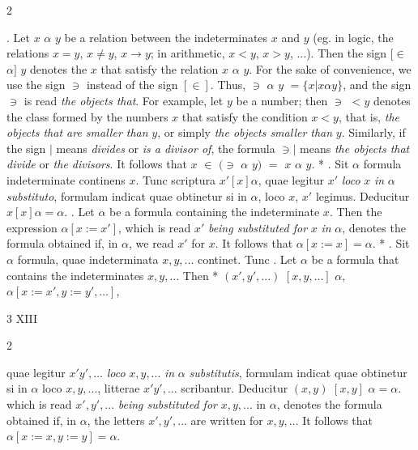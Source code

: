 \documentclass{book}
\newcommand{\s}{\switchcolumn} %
\newcommand{\peanoPage}[1]{\vspace{1ex}

  \columnratio{0.475, 0.05, 0.475} \begin{paracol}{3} \centering \hdashrule{\columnwidth}{0.1mm}{0.1mm 1mm} \s #1 \s \hdashrule{\columnwidth}{0.1mm}{0.1mm 1mm} \end{paracol}

\vspace{1ex}}
\newenvironment{translateTwoCol}
               { %
                 \columnratio{0.5, 0.5} \begin{paracol}{2}
                 \newcommand{\LAT}{\switchcolumn[0]*}
                 \newcommand{\ENG}{\switchcolumn[1]}
               }
               { %
                 \let\ENG\undefined
                 \let\LAT\undefined
                 \end{paracol}
               }
\begin{document}
\begin{translateTwoCol}
\ENG
{}. Let $x$ $\alpha$ $y$ be a relation between the indeterminates $x$ and $y$ (eg. in logic, the relations $x = y$, $x \not= y$, $x \rightarrow y$; in arithmetic, $x < y$, $x > y$, ...). Then the sign $[\in$ $\alpha]$ $y$ denotes the $x$ that satisfy the relation $x$ $\alpha$ $y$. For the sake of convenience, we use the sign $\ni$ instead of the sign $[\in]$. Thus, $\ni$ $\alpha$ $y$  $= \{ x | x \alpha y \}$, and the sign $\ni$ is read \emph{the objects that}. For example, let $y$ be a number; then $\ni$ $< y$ denotes the class formed by the numbers $x$ that satisfy the condition $x<y$, that is, \emph{the objects that are smaller than} $y$, or simply \emph{the objects smaller than} $y$. Similarly, if the sign $|$ means \emph{divides} or \emph{is a divisor of}, the formula $\ni|$ means \emph{the objects that divide} or \emph{the divisors}. It follows that $x$ $\in$ $(\ni$ $\alpha$ $y)$ $=$ $x$ $\alpha$ $y$.
\LAT
{}. Sit $\alpha$ formula indeterminate continens $x$. Tunc scriptura $x' [x] \alpha$, quae legitur $x'$ \emph{loco} $x$ \emph{in} $\alpha$ \emph{substituto}, formulam indicat quae obtinetur si in $\alpha$, loco $x$, $x'$ legimus. Deducitur $x [x] \alpha = \alpha$.
\ENG
{}. Let $\alpha$ be a formula containing the indeterminate $x$. Then the expression $\alpha [ x := x' ]$, which is read $x'$ \emph{being substituted for} $x$ \emph{in} $\alpha$, denotes the formula obtained if, in $\alpha$, we read $x'$ for $x$. It follows that $\alpha[x := x] = \alpha$.
\LAT
{}. Sit $\alpha$ formula, quae indeterminata $x,y,...$ continet. Tunc
\ENG
{}. Let $\alpha$ be a formula that contains the indeterminates $x,y,...$ Then
\LAT
\hspace{1.06cm} $(x',y',...)$ $[x,y,...]$ $\alpha$,
\ENG
\hspace{1.06cm} $\alpha[x:=x', y:=y', \ldots]$,
\end{translateTwoCol}

\peanoPage{XIII} %

\begin{translateTwoCol}
quae legitur $x'y',...$ \emph{loco} $x,y,...$ \emph{in} $\alpha$ \emph{substitutis}, formulam indicat quae obtinetur si in $\alpha$ loco $x,y,...$, litterae $x'y',...$ scribantur. Deducitur $(x,y)$ $[x,y]$ $\alpha = \alpha$.
\ENG
which is read $x',y',...$ \emph{being substituted for} $x,y,...$ in $\alpha$, denotes the formula obtained if, in $\alpha$, the letters $x',y',...$ are written for $x,y,...$ It follows that $\alpha[x:=x,y:=y] = \alpha$.
\end{translateTwoCol}
\end{document}
